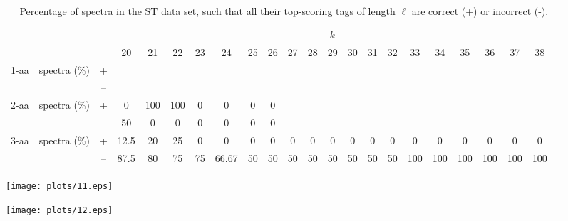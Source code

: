 \documentclass{article}
\def\STbar{{\overline{\mathrm{ST}}}}
\begin{document}
\begin{table}[ht]\footnotesize
\vspace{3mm}
{\centering
\begin{center}
\begin{tabular}{|c|cc|c|c|c|c|c|c|c|c|c|c|c|c|c|c|c|c|c|c|c|c|}
  \hline
  \multicolumn{3}{|c|}{ } & \multicolumn{ 19}{|c|}{$k$} \\
  \cline{4-22 }
  \multicolumn{3}{|c|}{ } 
 & 20 & 21 & 22 & 23 & 24 & 25 & 26 & 27 & 28 & 29 & 30 & 31 & 32 & 33 & 34 & 35 & 36 & 37 & 38\\
\hline
  \multirow{2}{*}{1-aa}& \multirow{2}{*}{spectra (\%)}  &  +
 &  &  &  &  &  &  &  &  &  &  &  &  &  &  &  &  &  &  & \\
 & 
 &  --
 &  &  &  &  &  &  &  &  &  &  &  &  &  &  &  &  &  &  & \\
\hline
  \multirow{2}{*}{2-aa}& \multirow{2}{*}{spectra (\%)}  &  +
 & 0 & 100 & 100 & 0 & 0 & 0 & 0 &  &  &  &  &  &  &  &  &  &  &  & \\
 & 
 &  --
 & 50 & 0 & 0 & 0 & 0 & 0 & 0 &  &  &  &  &  &  &  &  &  &  &  & \\
\hline
  \multirow{2}{*}{3-aa}& \multirow{2}{*}{spectra (\%)}  &  +
 & 12.5 & 20 & 25 & 0 & 0 & 0 & 0 & 0 & 0 & 0 & 0 & 0 & 0 & 0 & 0 & 0 & 0 & 0 & 0\\
 & 
 &  --
 & 87.5 & 80 & 75 & 75 & 66.67 & 50 & 50 & 50 & 50 & 50 & 50 & 50 & 50 & 100 & 100 & 100 & 100 & 100 & 100 \\
  \hline
\end{tabular}
\end{center}
\par}
\centering

\caption{Percentage of spectra in the $\STbar$ data set, such that all their top-scoring tags of length $\ell$ are correct (+) or incorrect (-).}

\vspace{3mm}
\label{table:all-top-scoring}
\end{table}
\texttt{[image: plots/11.eps]}

\texttt{[image: plots/12.eps]}
\end{document}

